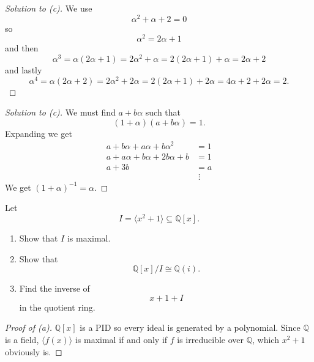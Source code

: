 \begin{proof}[Solution to (c)]
    We use
    \[
        \alpha^2 + \alpha + 2 = 0
    \]
    so 
    \[
        \alpha^2 = 2\alpha + 1
    \]
    and then 
    \[
        \alpha^3 = \alpha(2\alpha + 1) 
        = 2\alpha^2 + \alpha 
        = 2(2\alpha + 1) + \alpha 
        = 2\alpha + 2   
    \]
    and lastly 
    \[
        \alpha^4 = \alpha(2\alpha + 2) 
        = 2\alpha^2 + 2\alpha 
        = 2(2\alpha + 1) + 2\alpha
        = 4\alpha + 2 + 2\alpha 
        = 2. 
    \]
\end{proof}
\begin{proof}[Solution to (c)]
    We must find $a + b\alpha$ such that 
    \[
        (1 + \alpha)(a + b\alpha) = 1.
    \]
    Expanding we get 
    \begin{align*}
        a + b\alpha + a\alpha + b\alpha^2 &= 1 \\ 
        a + a\alpha + b\alpha + 2b\alpha + b &= 1 \\ 
        a + 3b &= a \\ 
               &\; \vdots
    \end{align*}
    We get $(1 + \alpha)^{-1} = \alpha$. 
\end{proof}

\begin{prob}
    Let 
    \[
        I = \langle x^2 + 1 \rangle \subseteq \mathbb Q[x].
    \]
    \begin{enumerate}[label=\alph*)]
        \item Show that $I$ is maximal. 
        \item Show that 
            \[
                \mathbb Q[x]/I \cong \mathbb Q(i).
            \]
        \item Find the inverse of 
            \[
                x + 1 + I
            \]
            in the quotient ring.
    \end{enumerate}
\end{prob}
\begin{proof}[Proof of (a)]
    $\mathbb Q[x]$ is a PID so every ideal is generated by 
    a polynomial.
    Since $\mathbb Q$ is a field, $\langle f(x) \rangle$ is maximal 
    if and only if $f$ is irreducible over $\mathbb Q$, 
    which $x^2 + 1$ obviously is. 
\end{proof} 

